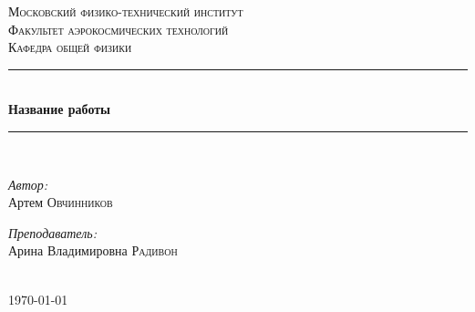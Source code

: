 \documentclass[1 pt]{article}
\begin{document}
\begin{titlepage}
\newcommand{\HRule}{\rule{\linewidth}{0.3 mm}} %

\center %
 

\textsc{\Large Московский физико-технический институт }\\[1.5cm] %
\textsc{\Large Факультет аэрокосмических технологий}\\[0.5cm] %
\textsc{\large Кафедра общей физики}\\[0.5cm] %


\HRule \\[0.4cm]
{ \huge \bfseries Название работы }\\[0.4cm] %
\HRule \\[1.5cm]
 

\begin{minipage}{0.4\textwidth}
\begin{flushleft} \large
\emph{Автор:}\\ Артем \textsc{Овчинников} %
\end{flushleft}
\end{minipage}
\begin{minipage}{0.4\textwidth}
\begin{flushright} \large
\emph{Преподаватель:} \\
Арина Владимировна \textsc{Радивон} %
\end{flushright}
\end{minipage}\\[4cm]

{\large \today}\\[2cm] %


 

\vfill %

\end{titlepage}
\tableofcontents
\newpage
\end{document}
